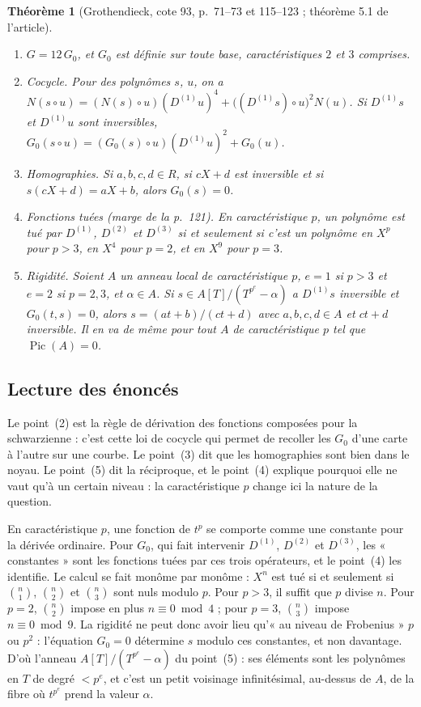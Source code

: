\documentclass[11pt,a4paper]{amsart}
\theoremstyle{definition}
\theoremstyle{plain}
\newtheorem{theoreme}{Théorème}
\theoremstyle{remark}
\theoremstyle{plain}
\begin{document}
\begin{theoreme}[Grothendieck, cote 93, p.~71--73 et 115--123 ; théorème 5.1 de l'article]
\leavevmode
\begin{enumerate}
\item $G = 12\,G_0$, et $G_0$ est définie sur toute base, caractéristiques $2$ et $3$ comprises.
\item \emph{Cocycle.} Pour des polynômes $s$, $u$, on a $N(s\circ u) = (N(s)\circ u)(D^{(1)}u)^4 + \bigl((D^{(1)}s)\circ u\bigr)^2N(u)$. Si $D^{(1)}s$ et $D^{(1)}u$ sont inversibles, $G_0(s\circ u) = (G_0(s)\circ u)(D^{(1)}u)^2 + G_0(u)$.
\item \emph{Homographies.} Si $a, b, c, d \in R$, si $cX + d$ est inversible et si $s(cX + d) = aX + b$, alors $G_0(s) = 0$.
\item \emph{Fonctions tuées} (marge de la p.~121). En caractéristique $p$, un polynôme est tué par $D^{(1)}$, $D^{(2)}$ et $D^{(3)}$ si et seulement si c'est un polynôme en $X^p$ pour $p > 3$, en $X^4$ pour $p = 2$, et en $X^9$ pour $p = 3$.
\item \emph{Rigidité.} Soient $A$ un anneau local de caractéristique $p$, $e = 1$ si $p > 3$ et $e = 2$ si $p = 2, 3$, et $\alpha \in A$. Si $s \in A[T]/(T^{p^e} - \alpha)$ a $D^{(1)}s$ inversible et $G_0(t, s) = 0$, alors $s = (at + b)/(ct + d)$ avec $a, b, c, d \in A$ et $ct + d$ inversible. Il en va de même pour tout $A$ de caractéristique $p$ tel que $\operatorname{Pic}(A) = 0$.
\end{enumerate}
\end{theoreme}

\subsection{Lecture des énoncés}

Le point~(2) est la règle de dérivation des fonctions composées pour la schwarzienne : c'est cette loi de cocycle qui permet de recoller les $G_0$ d'une carte à l'autre sur une courbe. Le point~(3) dit que les homographies sont bien dans le noyau. Le point~(5) dit la réciproque, et le point~(4) explique pourquoi elle ne vaut qu'à un certain niveau : la caractéristique $p$ change ici la nature de la question.

En caractéristique $p$, une fonction de $t^p$ se comporte comme une constante pour la dérivée ordinaire. Pour $G_0$, qui fait intervenir $D^{(1)}$, $D^{(2)}$ et $D^{(3)}$, les « constantes » sont les fonctions tuées par ces trois opérateurs, et le point~(4) les identifie. Le calcul se fait monôme par monôme : $X^n$ est tué si et seulement si $\binom n1$, $\binom n2$ et $\binom n3$ sont nuls modulo $p$. Pour $p > 3$, il suffit que $p$ divise $n$. Pour $p = 2$, $\binom n2$ impose en plus $n \equiv 0 \bmod 4$ ; pour $p = 3$, $\binom n3$ impose $n \equiv 0 \bmod 9$. La rigidité ne peut donc avoir lieu qu'« au niveau de Frobenius » $p$ ou $p^2$ : l'équation $G_0 = 0$ détermine $s$ modulo ces constantes, et non davantage. D'où l'anneau $A[T]/(T^{p^e} - \alpha)$ du point~(5) : ses éléments sont les polynômes en $T$ de degré $< p^e$, et c'est un petit voisinage infinitésimal, au-dessus de $A$, de la fibre où $t^{p^e}$ prend la valeur $\alpha$.
\end{document}
